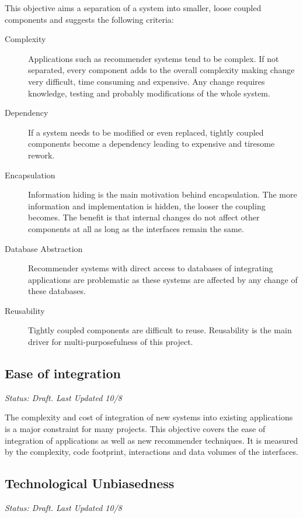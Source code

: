 This objective aims a separation of a system into smaller, loose coupled components and suggests the following criteria:

\begin{description}
    \item[Complexity] Applications such as recommender systems tend to be complex. If not separated, every component adds to the overall complexity making change very difficult, time consuming and expensive. Any change requires knowledge, testing and probably modifications of the whole system.
    \item[Dependency] If a system needs to be modified or even replaced, tightly coupled components become a dependency leading to expensive and tiresome rework.
    \item[Encapsulation] Information hiding is the main motivation behind encapsulation. The more information and implementation is hidden, the looser the coupling becomes. The benefit is that internal changes do not affect other components at all as long as the interfaces remain the same.
    \item[Database Abstraction] Recommender systems with direct access to databases of integrating applications are problematic as these systems are affected by any change of these databases.
    \item[Reusability] Tightly coupled components are difficult to reuse. Reusability is the main driver for multi-purposefulness of this project.
\end{description}

\subsection{Ease of integration}
\label{intro-objectives-easeofintegration}

\emph{Status: Draft. Last Updated 10/8}

The complexity and cost of integration of new systems into existing applications is a major constraint for many projects. This objective covers the ease of integration of applications as well as new recommender techniques. It is measured by the complexity, code footprint, interactions and data volumes of the interfaces.

\subsection{Technological Unbiasedness}

\emph{Status: Draft. Last Updated 10/8}

